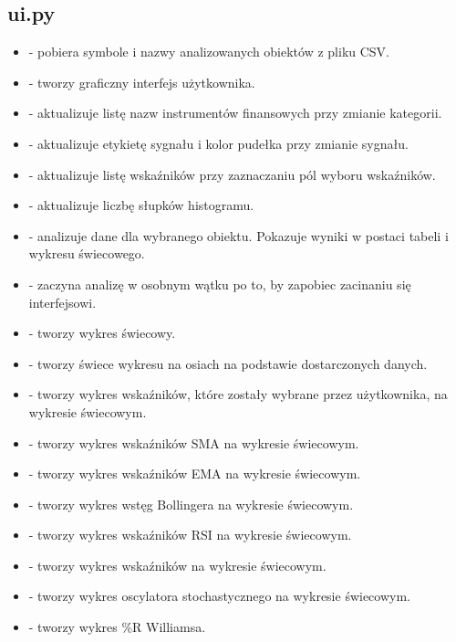 \documentclass[12pt]{article}
\begin{document}
	\subsection{ui.py}
		\begin{itemize}
			\item {} - pobiera symbole i nazwy analizowanych obiektów z pliku CSV.
			\item {} - tworzy graficzny interfejs użytkownika.
			\item {} - aktualizuje listę nazw instrumentów finansowych przy zmianie kategorii.
			\item {} - aktualizuje etykietę sygnału i kolor pudełka przy zmianie sygnału.
			\item {} - aktualizuje listę wskaźników przy zaznaczaniu pól wyboru wskaźników.
			\item {} - aktualizuje liczbę słupków histogramu.
			\item {} - analizuje dane dla wybranego obiektu.
			Pokazuje wyniki w postaci tabeli i wykresu świecowego.
			\item {} - zaczyna analizę w osobnym wątku po to, by zapobiec zacinaniu się interfejsowi.
			\item {} - tworzy wykres świecowy.
			\item {} - tworzy świece wykresu na osiach na podstawie dostarczonych danych.
			\item {} - tworzy wykres wskaźników, które zostały wybrane przez użytkownika, na wykresie
			świecowym.
			\item {} - tworzy wykres wskaźników SMA na wykresie świecowym.
			\item {} - tworzy wykres wskaźników EMA na wykresie świecowym.
			\item {} - tworzy wykres wstęg Bollingera na wykresie świecowym.
			\item {} - tworzy wykres wskaźników RSI na wykresie świecowym.
			\item {} - tworzy wykres wskaźników na wykresie świecowym.
			\item {} - tworzy wykres oscylatora stochastycznego na wykresie świecowym.
			\item {} - tworzy wykres \%R Williamsa.
		\end{itemize}
\end{document}
